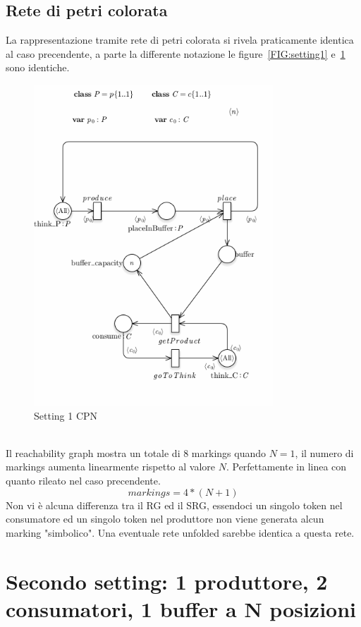 \documentclass{article}
\begin{document}
\subsection{Rete di petri colorata}
La rappresentazione tramite rete di petri colorata si rivela praticamente identica al caso precendente, a parte la differente notazione le figure~\ref{FIG:setting1} e~\ref{FIG:setting1_CPN} sono identiche.
\begin{figure}[!ht]
\centering
\includegraphics[width=0.8\textwidth]{./Esercizio2_img/setting_1_CPN.png}
\caption{Setting 1 CPN} \label{FIG:setting1_CPN}
\end{figure}\\
Il reachability graph mostra un totale di 8 markings quando $N =1$, il numero di markings aumenta linearmente rispetto al valore $N$.
Perfettamente in linea con quanto rileato nel caso precendente.
$$markings = 4*(N + 1)$$
Non vi è alcuna differenza tra il RG ed il SRG, essendoci un singolo token nel consumatore ed un singolo token nel produttore non viene generata alcun marking "simbolico".
Una eventuale rete unfolded sarebbe identica a questa rete.
\newpage
\section{Secondo  setting: 1 produttore, 2 consumatori,  1 buffer a N posizioni}\label{SEC:secondo}
\end{document}
